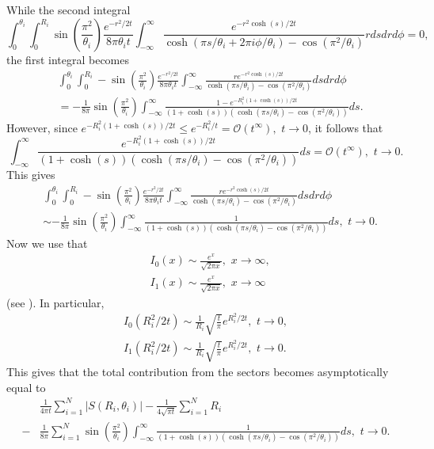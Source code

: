 \documentclass{amsart}
\theoremstyle{definition}
\begin{document}
While the second integral
\begin{equation*}
    \int_0^{\theta_i}\int_0^{R_i} \sin\left(\frac{\pi^2}{\theta_i}\right) \frac{e^{-r^2/2t}}{8\pi\theta_i t} \int_{-\infty}^\infty \frac{e^{-r^2\cosh(s)/2t}}{\cosh(\pi s/\theta_i + 2\pi i\phi/\theta_i) - \cos(\pi^2/\theta_i)} rds drd\phi = 0,
\end{equation*}
the first integral becomes
\begin{align*}
    &\int_0^{\theta_i}\int_0^{R_i} -\sin\left(\frac{\pi^2}{\theta_i}\right) \frac{e^{-r^2/2t}}{8\pi\theta_it} \int_{-\infty}^\infty \frac{re^{-r^2\cosh(s)/2t}}{\cosh(\pi s/\theta_i) - \cos(\pi^2/\theta_i)} ds drd\phi \\
    &= -\frac{1}{8\pi}\sin\left(\frac{\pi^2}{\theta_i}\right) \int_{-\infty}^\infty \frac{1 - e^{-R_i^2(1+\cosh(s))/2t}}{(1+\cosh(s))(\cosh(\pi s/\theta_i) - \cos(\pi^2/\theta_i))} ds.
\end{align*}
However, since $e^{-R_i^2(1+\cosh(s))/2t} \leq e^{-R_i^2/t} = \mathcal{O}(t^\infty), \,\, t \to 0$, it follows that
\begin{equation*}
    \int_{-\infty}^\infty \frac{e^{-R_i^2(1+\cosh(s))/2t}}{(1+\cosh(s))(\cosh(\pi s/\theta_i) - \cos(\pi^2/\theta_i))} ds  = \mathcal{O}(t^\infty), \,\, t \to 0.
\end{equation*}
This gives  
\begin{align*}
    &\int_0^{\theta_i}\int_0^{R_i} -\sin\left(\frac{\pi^2}{\theta_i}\right) \frac{e^{-r^2/2t}}{8\pi\theta_it} \int_{-\infty}^\infty \frac{re^{-r^2\cosh(s)/2t}}{\cosh(\pi s/\theta_i) - \cos(\pi^2/\theta_i)} ds drd\phi \\
    &\sim -\frac{1}{8\pi} \sin\left(\frac{\pi^2}{\theta_i}\right) \int_{-\infty}^\infty \frac{1}{(1+\cosh(s))(\cosh(\pi s/\theta_i) - \cos(\pi^2/\theta_i))} ds, \,\, t \to 0.
\end{align*}
Now we use that 
\begin{align*}
    &I_0(x) \sim \frac{e^x}{\sqrt{2\pi x}}, \,\, x \to \infty, \\
    &I_1(x) \sim \frac{e^x}{\sqrt{2\pi x}}, \,\, x \to \infty
\end{align*}
(see \cite{watson1922treatise}). In particular,
\begin{align*}
    I_0(R_i^2/2t) \sim \frac{1}{R_i}\sqrt{\frac{t}{\pi}} e^{R_i^2/2t}, \,\, t \to 0, \\
    I_1(R_i^2/2t) \sim \frac{1}{R_i}\sqrt{\frac{t}{\pi}} e^{R_i^2/2t}, \,\, t \to 0.
\end{align*}
This gives that the total contribution from the sectors becomes asymptotically equal to
\begin{align*}
    &\frac{1}{4\pi t} \sum_{i = 1}^N |S(R_i, \theta_i)| - \frac{1}{4\sqrt{\pi t}}\sum_{i=1}^N R_i \\
    -&\frac{1}{8\pi} \sum_{i = 1}^N \sin\left(\frac{\pi^2}{\theta_i}\right) \int_{-\infty}^\infty \frac{1}{(1+\cosh(s))(\cosh(\pi s/\theta_i) - \cos(\pi^2/\theta_i))} ds, \,\, t \to 0.
\end{align*}
\end{document}

